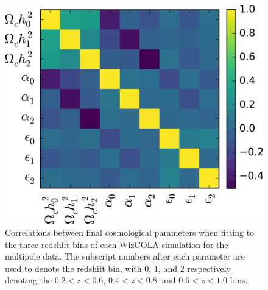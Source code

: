 \documentclass[iop,twocolappendix]{emulateapj}
\begin{document}
\begin{figure}[t]
	\begin{center}
		\includegraphics[width=0.85\columnwidth]{images/correlations.png}
	\end{center}
	\caption{Correlations between final cosmological parameters when fitting to the three redshift bins of each WizCOLA simulation for the multipole data. The subscript numbers after each parameter are used to denote the redshift bin, with $0$, $1$, and $2$ respectively denoting the $0.2 < z < 0.6$, $0.4 < z < 0.8$, and $0.6 < z < 1.0$ bins. }
	\label{fig:correlations}
\end{figure}
\end{document}
